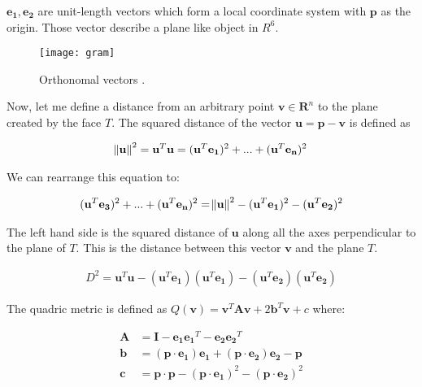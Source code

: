 $\mathbf{e_1}, \mathbf{e_2}$ are unit-length vectors which form a local coordinate system with $\mathbf{p}$ as the origin. Those vector describe a plane like object in $R^6$.

\begin{figure}[H]
  \begin{center}
    \texttt{[image: gram]}
    \caption{Orthonomal vectors \cite{garland99}.}
    \label{fig:gram}
  \end{center}
\end{figure}

Now, let me define a distance from an arbitrary point $\mathbf{v}\in\mathbf{R}^n$ to the plane created by the face $T$. The squared distance of the vector $\mathbf{u} = \mathbf{p} - \mathbf{v}$ is defined as \cite{garland99}

\begin{align}
\norm{\mathbf{u}}^2 = \mathbf{u}^T\mathbf{u} = (\mathbf{u}^T\mathbf{e_1})^2 + ... +  (\mathbf{u}^T\mathbf{e_n})^2
\end{align}

We can rearrange this equation to:

\begin{align}
(\mathbf{u}^T\mathbf{e_3})^2 + ... +  (\mathbf{u}^T\mathbf{e_n})^2 = \norm{\mathbf{u}}^2 - (\mathbf{u}^T\mathbf{e_1})^2 - (\mathbf{u}^T\mathbf{e_2})^2
\end{align}

The left hand side is the squared distance of $\mathbf{u}$ along all the axes perpendicular to the plane of $T$. This is the distance between this vector $\mathbf{v}$ and the plane $T$.

\begin{align}
D^2 = \mathbf{u}^T\mathbf{u} - (\mathbf{u}^T\mathbf{e_1})(\mathbf{u}^T\mathbf{e_1}) - (\mathbf{u}^T\mathbf{e_2})(\mathbf{u}^T\mathbf{e_2})
\end{align}

The quadric metric is defined as $Q(\mathbf{v}) = \mathbf{v}^T\mathbf{A}\mathbf{v} + 2\mathbf{b}^T\mathbf{v} + c$ where:

\begin{align}
\mathbf{A} &= \mathbf{I} - \mathbf{e_1}\mathbf{e_1}^T - \mathbf{e_2}\mathbf{e_2}^T\\
\mathbf{b} &= (\mathbf{p} \cdot \mathbf{e_1})\mathbf{e_1} + (\mathbf{p} \cdot \mathbf{e_2})\mathbf{e_2} - \mathbf{p}\\ 
\mathbf{c} &= \mathbf{p} \cdot \mathbf{p} - (\mathbf{p} \cdot \mathbf{e_1})^2 - (\mathbf{p} \cdot \mathbf{e_2})^2 
\end{align}

